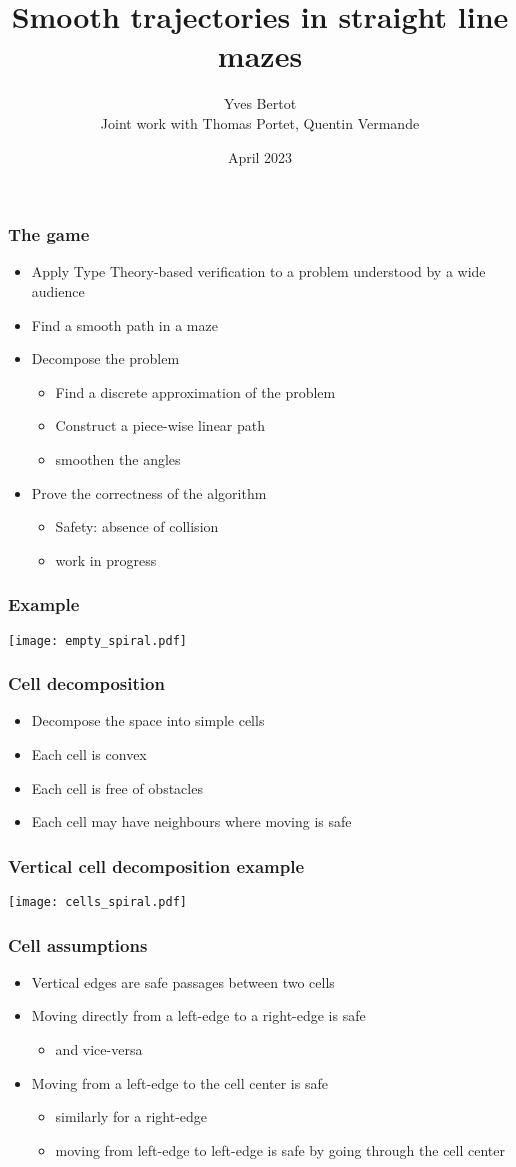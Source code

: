 \documentclass[compress]{beamer}
\title{Smooth trajectories in straight line mazes}
\author{Yves Bertot\\
Joint work with Thomas Portet, Quentin Vermande}
\date{April 2023}
\begin{document}
\maketitle
\begin{frame}
\frametitle{The game}
\begin{itemize}
\item Apply Type Theory-based verification to a problem understood by a
  wide audience
\item Find a smooth path in a maze
\item Decompose the problem
\begin{itemize}
\item Find a discrete approximation of the problem
\item Construct a piece-wise linear path
\item smoothen the angles
\end{itemize}
\item Prove the correctness of the algorithm
\begin{itemize}
\item Safety: absence of collision
\item work in progress
\end{itemize}
\end{itemize}
\end{frame}
\begin{frame}
\frametitle{Example}
\texttt{[image: empty\_spiral.pdf]}
\end{frame}
\begin{frame}
\frametitle{Cell decomposition}
\begin{itemize}
\item Decompose the space into simple cells
\item Each cell is convex
\item Each cell is free of obstacles
\item Each cell may have neighbours where moving is safe
\end{itemize}
\end{frame}
\begin{frame}
\frametitle{Vertical cell decomposition example}
\texttt{[image: cells\_spiral.pdf]}
\end{frame}
\begin{frame}
\frametitle{Cell assumptions}
\begin{itemize}
\item Vertical edges are safe passages between two cells
\item Moving directly from a left-edge to a right-edge is safe
\begin{itemize}
\item and vice-versa
\end{itemize}
\item Moving from a left-edge to the cell center is safe
\begin{itemize}
\item similarly for a right-edge
\item moving from left-edge to left-edge is safe by going through the
  cell center
\end{itemize}
\end{itemize}
\end{frame}
\end{document}
